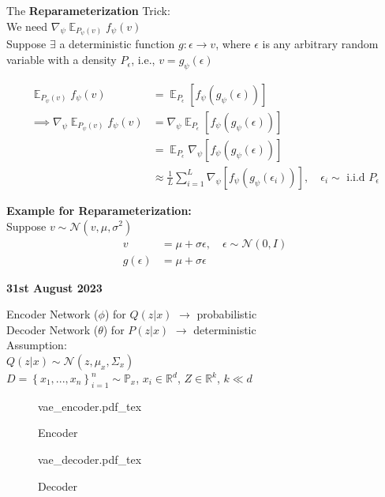 \documentclass[11pt]{article}
\DeclareMathOperator*{\E}{\mathbb{E}}
\begin{document}
The \textbf{Reparameterization} Trick: \\
We need $\nabla_{\psi}\E_{P_{\psi}(v)}f_{\psi}(v)$ \\
Suppose $\exists$ a deterministic function $g: \epsilon \rightarrow v$, where $\epsilon$ is any arbitrary random variable with a density $P_{\epsilon}$, i.e., $v = g_{\psi}(\epsilon)$

\begin{align*}
  \E_{P_{\psi}(v)} f_{\psi}(v)
  &= \E_{P_{\epsilon}}\left[ f_{\psi}\left( g_{\psi}(\epsilon) \right) \right] \\
  \implies \nabla_{\psi}\E_{P_{\psi}(v)}f_{\psi}(v)
  &= \nabla_{\psi} \E_{P_{\epsilon}} \left[ f_{\psi}\left( g_{\psi}(\epsilon) \right) \right] \\
  &= \E_{P_{\epsilon}} \nabla_{\psi} \left[ f_{\psi}\left( g_{\psi}(\epsilon) \right) \right] \\
  &\approx \frac{1}{L} \sum_{i=1}^L \nabla_{\psi} \left[ f_{\psi}\left( g_{\psi}(\epsilon_i) \right) \right],
    \quad \epsilon_i \sim \text{ i.i.d } P_{\epsilon}
\end{align*}

\begin{framed}
  \textbf{Example for Reparameterization:} \\
  Suppose $v \sim \mathcal{N}(v, \mu, \sigma^2)$
  \begin{align*}
    v &= \mu + \sigma\epsilon, \quad \epsilon \sim \mathcal{N}(0, I) \\
    g(\epsilon) &= \mu + \sigma\epsilon
  \end{align*}
\end{framed}

\textbf{31st August 2023}

Encoder Network ($\phi$) for $Q(z|x)$ $\rightarrow$ probabilistic \\
Decoder Network ($\theta$) for $P(z|x)$ $\rightarrow$ deterministic \\


Assumption: \\
$Q(z|x) \sim \mathcal{N}(z, \mu_x, \Sigma_x)$ \\
$D = \left\{ x_1, ..., x_n \right\}^n_{i=1} \sim \mathbb{P}_x$,
$x_i \in \mathbb{R}^d$, $Z \in \mathbb{R}^k$, $k \ll d$


\begin{figure}[h]
  \begin{minipage}{0.45\textwidth}
    \centering
    \def\svgwidth{\columnwidth}
    {vae_encoder.pdf_tex}
    \caption{Encoder}
    \label{fig:vae-encoder}
  \end{minipage}%
  \begin{minipage}{0.45\textwidth}
    \centering
    \def\svgwidth{\columnwidth}
    {vae_decoder.pdf_tex}
    \caption{Decoder}
    \label{fig:vae-decoder}
  \end{minipage}%
\end{figure}
\end{document}
